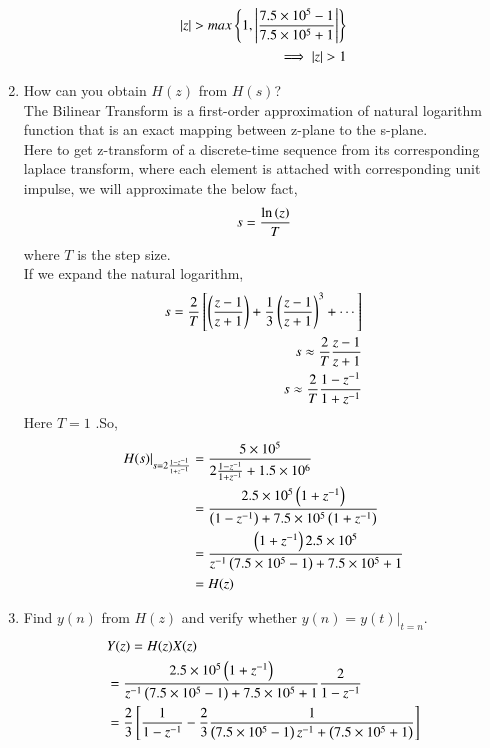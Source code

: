 \documentclass[journal,12pt,twocolumn]{IEEEtran}
\renewcommand\thesection{\arabic{section}}
\begin{document}
\begin{enumerate}[label=\arabic*.,ref=\thesection.\theenumi]
\begin{align}
		      \left\vert z\right\vert > max\left\{1,\left\vert\frac{7.5 \times 10^5 - 1}{7.5 \times 10^5 + 1}\right\vert\right\}\\
		\implies \left\vert z\right\vert > 1
	      \end{align}
	\item How can you obtain $H(z)$ from $H(s)$?\\
		\solution The Bilinear Transform is a first-order approximation of natural logarithm function that is an exact mapping between z-plane to the s-plane.\\
		Here to get z-transform of a discrete-time sequence from its corresponding laplace transform, where each element is attached with corresponding unit impulse, we will approximate the below fact,
		 \begin{align}
			 s = \frac{\ln\left(z\right)}{T}
		 \end{align}
		 where $T$ is the step size.\\
		 If we expand the natural logarithm,
		  \begin{align}
			  s = \frac{2}{T}{}\left[\left(\frac{z-1}{z+1}\right) + \frac{1}{3}\left(\frac{z-1}{z+1}\right)^3 + \cdots\right]\\
			  s \approx \frac{2}{T}\frac{z -1}{z + 1} \\
			  s \approx \frac{2}{T}\frac{1 - z^{-1}}{1 + z^{-1}}
		  \end{align}
	Here $T = 1$ .So,
	 \begin{align}
		 H(s)\vert_{s = 2\frac{1 - z^{-1}}{1 + z^{-1}}} &= \frac{5 \times 10^5}{2\frac{1 - z^{-1}}{1 + z^{-1}} + 1.5 \times 10^6} \\
								&= \frac{2.5 \times 10^5\left(1 + z^{-1}\right)}{\left(1-z^{-1}\right) + 7.5 \times 10^5\left(1 + z^{-1}\right)} \\
								&= \frac{\left(1 + z^{-1}\right)2.5 \times 10^5}{z^{-1}\left(7.5 \times 10^5 - 1\right) + 7.5\times 10^5 + 1} \\
								&= H(z)
	 \end{align}
        \item Find $y(n)$ from $H(z)$ and verify whether $y(n) = y(t)\vert_{t = n}$.\\
	 \solution 
	 \begin{align}
		 &Y(z) = H(z)X(z) \\
		      &= \frac{2.5 \times 10^5\left(1 + z^{-1}\right)}{z^{-1}\left(7.5 \times10^5 -1\right) + 7.5\times 10^5 + 1}\frac{2}{1 - z^{-1}} \\
		      &= \frac{2}{3}{}\left[\frac{1}{1-z^{-1}} - \frac{2}{3} \frac{1}{\left(7.5 \times 10^5 - 1\right)z^{-1} + \left(7.5 \times 10^5 +1\right)}\right]
	 \end{align}

\end{enumerate}
\end{document}
